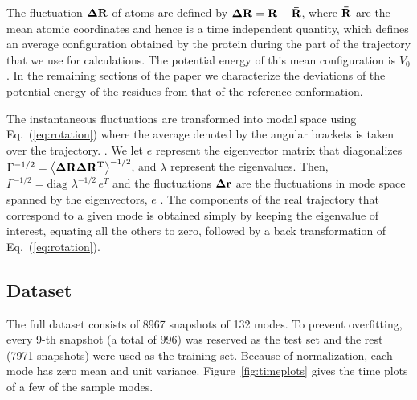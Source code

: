 \documentclass{article}
\begin{document}
The fluctuation ${\bf \Delta R}$ of atoms are defined by ${\bf \Delta
R} = {\bf {R}-\bar{R}}$, where ${\bf \bar{R}}$ are the mean atomic
coordinates and hence is a time independent quantity, which defines an
average configuration obtained by the protein during the part of the
trajectory that we use for calculations. The potential energy of this
mean configuration is $V_0$. In the remaining sections of the paper we
characterize the deviations of the potential energy of the residues
from that of the reference conformation.




The instantaneous fluctuations are transformed into modal space using
Eq.~(\ref{eq:rotation}) where the average denoted by the angular
brackets is taken over the trajectory. \cite{Amadei1993,Yogurtcu2009}.
We let $e$ represent the eigenvector matrix that diagonalizes
$\Gamma^{-1/2} = \left<{\bf \Delta R \Delta R^T} \right>^{-1/2}$, and
$\lambda$ represent the eigenvalues. Then, $\Gamma^{-1/2}= \mbox{diag }
\lambda^{-1/2}\, e^T$ and the fluctuations ${\bf \Delta r}$ are the
fluctuations in mode space spanned by the eigenvectors, $e$
\cite{Yogurtcu2009}. The components of the real trajectory that
correspond to a given mode is obtained simply by keeping the
eigenvalue of interest, equating all the others to zero, followed by a
back transformation of Eq.~(\ref{eq:rotation}).

\subsection{Dataset}


The full dataset consists of 8967 snapshots of 132 modes.  To prevent
overfitting, every 9-th snapshot (a total of 996) was reserved as the
test set and the rest (7971 snapshots) were used as the training set.
Because of normalization, each mode has zero mean and unit variance.
Figure~\ref{fig:timeplots} gives the time plots of a few of the sample
modes.  
\end{document}
